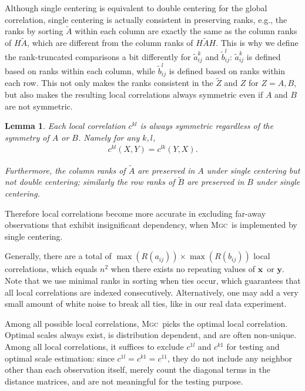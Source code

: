 \documentclass[11pt]{article}
\newcommand{\note}[2][]{\added[#1,remark={#2}]{}}
\providecommand{\sct}[1]{{\normalfont\textsc{#1}}}
\providecommand{\mt}[1]{\widetilde{#1}}
\providecommand{\mb}[1]{\boldsymbol{#1}}
\newcommand{\G}{c}
\newcommand{\Mgc}{\sct{Mgc}}
\newcommand{\cs}[1]{{\note{cs: #1}}}
\newcommand{\mbx}{\ensuremath{\mb{x}}}
\newcommand{\mby}{\ensuremath{\mb{y}}}
\newtheorem{lem}{Lemma}
\begin{document}
Although single centering is equivalent to double centering for the global correlation, single centering is actually consistent in preserving ranks, e.g., the ranks by sorting $\tilde{A}$ within each column are exactly the same as the column ranks of $H\tilde{A}$, which are different from the column ranks of $H\tilde{A}H$. This is why we define the rank-truncated comparisons a bit differently for $\mt{a}_{ij}^k$ and $\mt{b}_{ij}^l$: $\mt{a}_{ij}^k$ is defined based on ranks within each column, while $\mt{b}_{ij}^l$ is defined based on ranks within each row. This not only makes the ranks consistent in the $\tilde{Z}$ and $Z$ for $Z=A,B$, but also makes the resulting local correlations always symmetric even if $A$ and $B$ are not symmetric.

\begin{lem}
Each local correlation $\G^{kl}$ is always symmetric regardless of the symmetry of $A$ or $B$. Namely for any $k,l$, 
\begin{align*}
\G^{kl}(X,Y)=\G^{lk}(Y,X).
\end{align*}

Furthermore, the column ranks of $\tilde{A}$ are preserved in $A$ under single centering but not double centering; similarly the row ranks of $\tilde{B}$ are preserved in $B$ under single centering.
\end{lem}
Therefore local correlations become more accurate in excluding far-away observations that exhibit insignificant dependency, when \Mgc~is implemented by single centering.

\cs{where are the proofs of these lemmas?}

Generally, there are a total of $\max(R(a_{ij})) \times \max(R(b_{ij}))$ local correlations, which equals $n^2$ when there exists no repeating values of \mbx~or \mby. Note that we use minimal ranks in sorting when ties occur, which guarantees that all local correlations are indexed consecutively. Alternatively, one may add a very small amount of white noise to break all ties, like in our real data experiment.

Among all possible local correlations, \Mgc~picks the optimal local correlation. Optimal scales always exist,  is distribution dependent, and are often non-unique. Among all local correlations, it suffices to exclude $\G^{1l}$ and $\G^{k1}$ for testing and optimal scale estimation: since $\G^{1l}=\G^{k1}=\G^{11}$, they do not include any neighbor other than each observation itself, merely count the diagonal terms in the distance matrices, and are not meaningful for the testing purpose.
\end{document}
